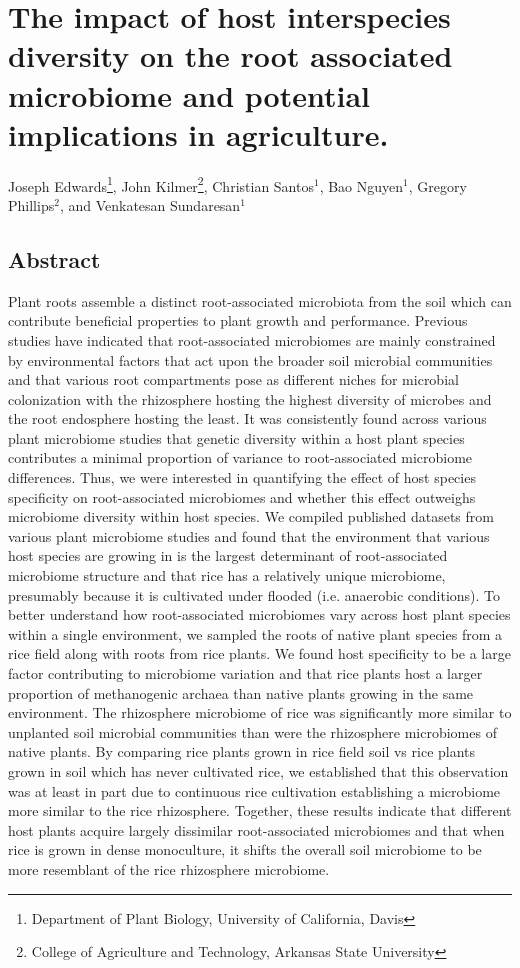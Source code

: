 \chapter{The impact of host interspecies diversity on the root associated microbiome and potential implications in agriculture.}

Joseph Edwards\footnote[1]{Department of Plant Biology, University of California, Davis}, John Kilmer\footnote[2]{College of Agriculture and Technology, Arkansas State University}, Christian Santos$^1$, Bao Nguyen$^1$, Gregory Phillips$^2$, and Venkatesan Sundaresan$^1$

\section{Abstract}

Plant roots assemble a distinct root-associated microbiota from the soil which can contribute beneficial properties to plant growth and performance. Previous studies have indicated that root-associated microbiomes are mainly constrained by environmental factors that act upon the broader soil microbial communities and that various root compartments pose as different niches for microbial colonization with the rhizosphere hosting the highest diversity of microbes and the root endosphere hosting the least. It was consistently found across various plant microbiome studies that genetic diversity within a host plant species contributes a minimal proportion of variance to root-associated microbiome differences. Thus, we were interested in quantifying the effect of host species specificity on root-associated microbiomes and whether this effect outweighs microbiome diversity within host species. We compiled published datasets from various plant microbiome studies and found that the environment that various host species are growing in is the largest determinant of root-associated microbiome structure and that rice has a relatively unique microbiome, presumably because it is cultivated under flooded (i.e. anaerobic conditions). To better understand how root-associated microbiomes vary across host plant species within a single environment, we sampled the roots of native plant species from a rice field along with roots from rice plants. We found host specificity to be a large factor contributing to microbiome variation and that rice plants host a larger proportion of methanogenic archaea than native plants growing in the same environment. The rhizosphere microbiome of rice was significantly more similar to unplanted soil microbial communities than were the rhizosphere microbiomes of native plants. By comparing rice plants grown in rice field soil vs rice plants grown in soil which has never cultivated rice, we established that this observation was at least in part due to continuous rice cultivation establishing a microbiome more similar to the rice rhizosphere. Together, these results indicate that different host plants acquire largely dissimilar root-associated microbiomes and that when rice is grown in dense monoculture, it shifts the overall soil microbiome to be more resemblant of the rice rhizosphere microbiome.

